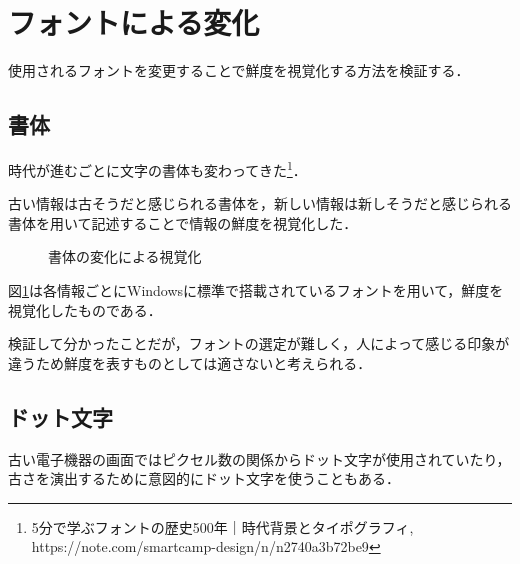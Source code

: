 \section{フォントによる変化}
\label{sec:ver-font}

使用されるフォントを変更することで鮮度を視覚化する方法を検証する．

\subsection{書体}
\label{subsec:ver-fnt-stl}

時代が進むごとに文字の書体も変わってきた\footnote{5分で学ぶフォントの歴史500年｜時代背景とタイポグラフィ, https://note.com/smartcamp-design/n/n2740a3b72be9}．

古い情報は古そうだと感じられる書体を，新しい情報は新しそうだと感じられる書体を用いて記述することで情報の鮮度を視覚化した．

\begin{figure}[htbp]
  \begin{center}
  \end{center}
  \caption{書体の変化による視覚化}
  \label{fig:ver-style}
\end{figure}

図\ref{fig:ver-style}は各情報ごとにWindowsに標準で搭載されているフォントを用いて，鮮度を視覚化したものである．

検証して分かったことだが，フォントの選定が難しく，人によって感じる印象が違うため鮮度を表すものとしては適さないと考えられる．

\subsection{ドット文字}
\label{subsec:ver-fnt-dot}

古い電子機器の画面ではピクセル数の関係からドット文字が使用されていたり，古さを演出するために意図的にドット文字を使うこともある．

